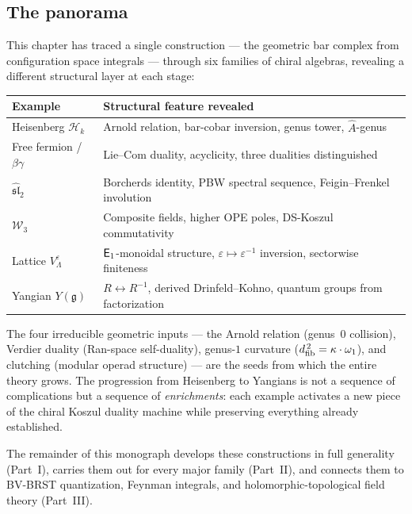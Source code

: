 \subsection{The panorama}

This chapter has traced a single construction --- the geometric bar
complex from configuration space integrals --- through six families
of chiral algebras, revealing a different structural layer at each
stage:

\begin{center}
\small
\renewcommand{\arraystretch}{1.3}
\begin{tabular}{l|l}
\textbf{Example} & \textbf{Structural feature revealed} \\
\hline
Heisenberg $\mathcal{H}_k$
  & Arnold relation, bar-cobar inversion, genus tower,
    $\hat{A}$-genus \\
Free fermion / $\beta\gamma$
  & Lie--Com duality, acyclicity, three dualities distinguished \\
$\widehat{\mathfrak{sl}}_2$
  & Borcherds identity, PBW spectral sequence,
    Feigin--Frenkel involution \\
$\mathcal{W}_3$
  & Composite fields, higher OPE poles,
    DS-Koszul commutativity \\
Lattice $V_\Lambda^\varepsilon$
  & $\mathsf{E}_1$-monoidal structure, $\varepsilon \mapsto \varepsilon^{-1}$
    inversion, sectorwise finiteness \\
Yangian $Y(\mathfrak{g})$
  & $R \leftrightarrow R^{-1}$,
    derived Drinfeld--Kohno,
    quantum groups from factorization
\end{tabular}
\end{center}

The four irreducible geometric inputs --- the Arnold relation (genus~$0$
collision), Verdier duality (Ran-space self-duality), genus-$1$ curvature
($d_{\mathrm{fib}}^{\,2} = \kappa \cdot \omega_1$), and clutching (modular operad
structure) --- are the seeds from which the entire theory grows.  The
progression from Heisenberg to Yangians is not a sequence of
complications but a sequence of \emph{enrichments}: each example
activates a new piece of the chiral Koszul duality machine while
preserving everything already established.

The remainder of this monograph develops these constructions in full
generality (Part~I), carries them out for every major family
(Part~II), and connects them to BV-BRST quantization, Feynman
integrals, and holomorphic-topological field theory (Part~III).
